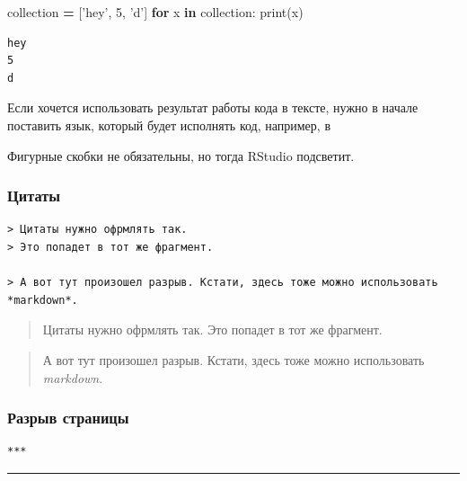 \documentclass[
]{book}
\newenvironment{Shaded}{\begin{snugshade}}{\end{snugshade}}
\newcommand{\BuiltInTok}[1]{#1}
\newcommand{\ControlFlowTok}[1]{\textcolor[rgb]{0.13,0.29,0.53}{\textbf{#1}}}
\newcommand{\DecValTok}[1]{\textcolor[rgb]{0.00,0.00,0.81}{#1}}
\newcommand{\KeywordTok}[1]{\textcolor[rgb]{0.13,0.29,0.53}{\textbf{#1}}}
\newcommand{\NormalTok}[1]{#1}
\newcommand{\OperatorTok}[1]{\textcolor[rgb]{0.81,0.36,0.00}{\textbf{#1}}}
\newcommand{\StringTok}[1]{\textcolor[rgb]{0.31,0.60,0.02}{#1}}
\begin{document}
\begin{Shaded}
\begin{Highlighting}[]
\NormalTok{collection }\OperatorTok{=}\NormalTok{ [}\StringTok{'hey'}\NormalTok{, }\DecValTok{5}\NormalTok{, }\StringTok{'d'}\NormalTok{]}
\ControlFlowTok{for}\NormalTok{ x }\KeywordTok{in}\NormalTok{ collection:}
    \BuiltInTok{print}\NormalTok{(x)}
\end{Highlighting}
\end{Shaded}

\begin{verbatim}
hey
5
d
\end{verbatim}

Если хочется использовать результат работы кода в тексте, нужно в начале поставить язык, который будет исполнять код, например, в

Фигурные скобки не обязательны, но тогда RStudio подсветит.

\hypertarget{ux446ux438ux442ux430ux442ux44b}{%
\subsubsection{Цитаты}\label{ux446ux438ux442ux430ux442ux44b}}

\begin{verbatim}
> Цитаты нужно офрмлять так.
> Это попадет в тот же фрагмент.

> А вот тут произошел разрыв. Кстати, здесь тоже можно использовать *markdown*.
\end{verbatim}

\begin{quote}
Цитаты нужно офрмлять так.
Это попадет в тот же фрагмент.
\end{quote}

\begin{quote}
А вот тут произошел разрыв. Кстати, здесь тоже можно использовать \emph{markdown}.
\end{quote}

\hypertarget{ux440ux430ux437ux440ux44bux432-ux441ux442ux440ux430ux43dux438ux446ux44b}{%
\subsubsection{Разрыв страницы}\label{ux440ux430ux437ux440ux44bux432-ux441ux442ux440ux430ux43dux438ux446ux44b}}

\begin{verbatim}
***
\end{verbatim}

\begin{center}\rule{0.5\linewidth}{0.5pt}\end{center}
\end{document}
